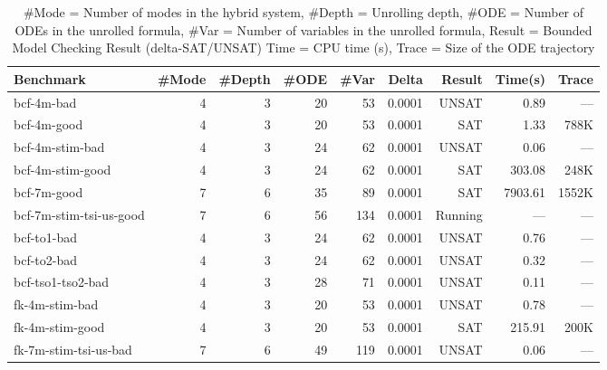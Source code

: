 {\small
\begin{table}[!th]
  \centering
  \small
  \begin{tabular}{l|r|r|r|r|r|r|r|r}
    \hline
    \hline
    Benchmark    & \#Mode& \#Depth & \#ODE & \#Var  & Delta  & Result       & Time(s) & Trace \\
    \hline
    \hline
    bcf-4m-bad & 4 & 3 & 20 & 53 & 0.0001 & UNSAT & 0.89 & ---\\
    bcf-4m-good & 4 & 3 & 20 & 53 & 0.0001 & SAT & 1.33 & 788K\\
    bcf-4m-stim-bad & 4 & 3 & 24 & 62 & 0.0001 & UNSAT & 0.06 & ---\\
    bcf-4m-stim-good & 4 & 3 & 24 & 62 & 0.0001 & SAT & 303.08 & 248K\\
    bcf-7m-good & 7 & 6 & 35 & 89 & 0.0001 & SAT & 7903.61 & 1552K\\
    bcf-7m-stim-tsi-us-good & 7 & 6 & 56 & 134 & 0.0001 & Running & --- & ---\\
    bcf-to1-bad & 4 & 3 & 24 & 62 & 0.0001 & UNSAT & 0.76 & ---\\
    bcf-to2-bad & 4 & 3 & 24 & 62 & 0.0001 & UNSAT & 0.32 & ---\\
    bcf-tso1-tso2-bad & 4 & 3 & 28 & 71 & 0.0001 & UNSAT & 0.11 & ---\\
    fk-4m-stim-bad & 4 & 3 & 20 & 53 & 0.0001 & UNSAT & 0.78 & ---\\
    fk-4m-stim-good & 4 & 3 & 20 & 53 & 0.0001 & SAT & 215.91 & 200K\\
    fk-7m-stim-tsi-us-bad & 7 & 6 & 49 & 119 & 0.0001 & UNSAT & 0.06 & ---\\
    \hline
    \hline
  \end{tabular}
  \caption{\small
    \#Mode = Number of modes in the hybrid system,
    \#Depth = Unrolling depth,
    \#ODE = Number of ODEs in the unrolled formula,
    \#Var = Number of variables in the unrolled formula,
    Result = Bounded Model Checking Result (delta-SAT/UNSAT)
    Time = CPU time (s),
    Trace = Size of the ODE trajectory
}\label{tbl:exp}
\end{table}
}
